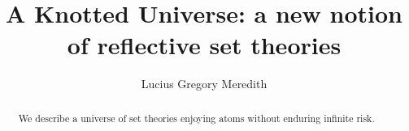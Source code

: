 \def\lastname{Meredith}

\title{A Knotted Universe: a new notion of reflective set theories}

\author{ Lucius Gregory Meredith
}


\maketitle              %
\thispagestyle{plain}   %


\begin{abstract}

  We describe a universe of set theories enjoying atoms without enduring infinite risk.

\end{abstract}



